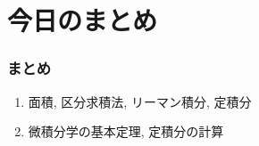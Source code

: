 











\section{今日のまとめ}
\begin{frame}
\frametitle{まとめ}   


\begin{enumerate}
\item 面積, 区分求積法, リーマン積分, 定積分
\item 微積分学の基本定理, 定積分の計算
\end{enumerate} 


\end{frame}
